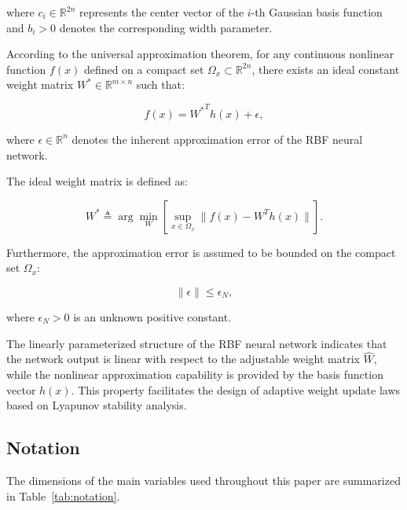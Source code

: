 where $c_i\in\mathbb{R}^{2n}$ represents the center vector of the $i$-th Gaussian basis function and $b_i>0$ denotes the corresponding width parameter.

According to the universal approximation theorem, for any continuous nonlinear function $f(x)$ defined on a compact set $\Omega_x\subset\mathbb{R}^{2n}$, there exists an ideal constant weight matrix $W^*\in\mathbb{R}^{m\times n}$ such that:

\begin{equation}
	f(x)
	=
	{W^*}^{T}h(x)
	+
	\epsilon,
	\label{eq:rbf_approximation}
\end{equation}

where $\epsilon\in\mathbb{R}^{n}$ denotes the inherent approximation error of the RBF neural network.

The ideal weight matrix is defined as:

\begin{equation}
	W^*
	\triangleq
	\arg\min_W
	\left[
	\sup_{x\in\Omega_x}
	\|f(x)-W^Th(x)\|
	\right].
\end{equation}

Furthermore, the approximation error is assumed to be bounded on the compact set $\Omega_x$:

\begin{equation}
	\|\epsilon\|\leq\epsilon_N,
\end{equation}

where $\epsilon_N>0$ is an unknown positive constant.

\begin{remark}
	The linearly parameterized structure of the RBF neural network indicates that the network output is linear with respect to the adjustable weight matrix $\hat{W}$, while the nonlinear approximation capability is provided by the basis function vector $h(x)$. This property facilitates the design of adaptive weight update laws based on Lyapunov stability analysis.
\end{remark}


\subsection{Notation}

The dimensions of the main variables used throughout this paper are summarized in Table~\ref{tab:notation}.

